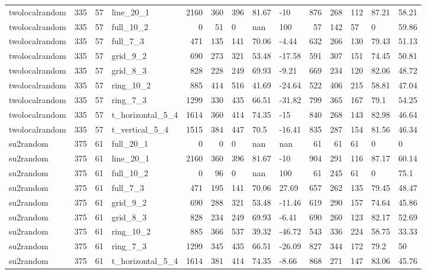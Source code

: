 \begin{longtable}{lrrlrrlllrrlll}
twolocalrandom & 335 & 57 & line\_20\_1 & 2160 & 360 & 396 & 81.67 & -10 & 876 & 268 & 112 & 87.21 & 58.21 \\
twolocalrandom & 335 & 57 & full\_10\_2 & 0 & 51 & 0 & nan & 100 & 57 & 142 & 57 & 0 & 59.86 \\
twolocalrandom & 335 & 57 & full\_7\_3 & 471 & 135 & 141 & 70.06 & -4.44 & 632 & 266 & 130 & 79.43 & 51.13 \\
twolocalrandom & 335 & 57 & grid\_9\_2 & 690 & 273 & 321 & 53.48 & -17.58 & 591 & 307 & 151 & 74.45 & 50.81 \\
twolocalrandom & 335 & 57 & grid\_8\_3 & 828 & 228 & 249 & 69.93 & -9.21 & 669 & 234 & 120 & 82.06 & 48.72 \\
twolocalrandom & 335 & 57 & ring\_10\_2 & 885 & 414 & 516 & 41.69 & -24.64 & 522 & 406 & 215 & 58.81 & 47.04 \\
twolocalrandom & 335 & 57 & ring\_7\_3 & 1299 & 330 & 435 & 66.51 & -31.82 & 799 & 365 & 167 & 79.1 & 54.25 \\
twolocalrandom & 335 & 57 & t\_horizontal\_5\_4 & 1614 & 360 & 414 & 74.35 & -15 & 840 & 268 & 143 & 82.98 & 46.64 \\
twolocalrandom & 335 & 57 & t\_vertical\_5\_4 & 1515 & 384 & 447 & 70.5 & -16.41 & 835 & 287 & 154 & 81.56 & 46.34 \\
su2random & 375 & 61 & full\_20\_1 & 0 & 0 & 0 & nan & nan & 61 & 61 & 61 & 0 & 0 \\
su2random & 375 & 61 & line\_20\_1 & 2160 & 360 & 396 & 81.67 & -10 & 904 & 291 & 116 & 87.17 & 60.14 \\
su2random & 375 & 61 & full\_10\_2 & 0 & 96 & 0 & nan & 100 & 61 & 245 & 61 & 0 & 75.1 \\
su2random & 375 & 61 & full\_7\_3 & 471 & 195 & 141 & 70.06 & 27.69 & 657 & 262 & 135 & 79.45 & 48.47 \\
su2random & 375 & 61 & grid\_9\_2 & 690 & 288 & 321 & 53.48 & -11.46 & 619 & 290 & 157 & 74.64 & 45.86 \\
su2random & 375 & 61 & grid\_8\_3 & 828 & 234 & 249 & 69.93 & -6.41 & 690 & 260 & 123 & 82.17 & 52.69 \\
su2random & 375 & 61 & ring\_10\_2 & 885 & 366 & 537 & 39.32 & -46.72 & 543 & 336 & 224 & 58.75 & 33.33 \\
su2random & 375 & 61 & ring\_7\_3 & 1299 & 345 & 435 & 66.51 & -26.09 & 827 & 344 & 172 & 79.2 & 50 \\
su2random & 375 & 61 & t\_horizontal\_5\_4 & 1614 & 381 & 414 & 74.35 & -8.66 & 868 & 271 & 147 & 83.06 & 45.76 \\

\end{longtable}
